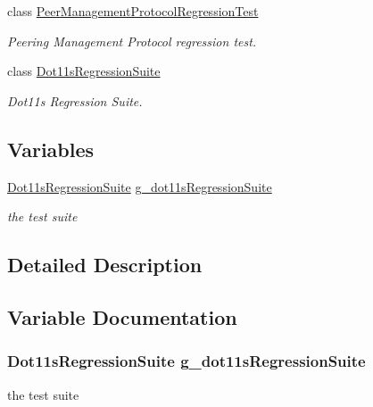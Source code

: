 \begin{DoxyCompactItemize}
class \hyperlink{classPeerManagementProtocolRegressionTest}{Peer\+Management\+Protocol\+Regression\+Test}
\begin{DoxyCompactList}\small\item\em Peering Management Protocol regression test. \end{DoxyCompactList}\item 
class \hyperlink{classDot11sRegressionSuite}{Dot11s\+Regression\+Suite}
\begin{DoxyCompactList}\small\item\em Dot11s Regression Suite. \end{DoxyCompactList}\end{DoxyCompactItemize}
\subsection*{Variables}
\begin{DoxyCompactItemize}
\item 
\hyperlink{classDot11sRegressionSuite}{Dot11s\+Regression\+Suite} \hyperlink{group__dot11s-test_ga0c680349a010296911d09487baac65a3}{g\+\_\+dot11s\+Regression\+Suite}
\begin{DoxyCompactList}\small\item\em the test suite \end{DoxyCompactList}\end{DoxyCompactItemize}


\subsection{Detailed Description}


\subsection{Variable Documentation}
\subsubsection[{\texorpdfstring{g\+\_\+dot11s\+Regression\+Suite}{g_dot11sRegressionSuite}}]{\setlength{\rightskip}{0pt plus 5cm} {\bf Dot11s\+Regression\+Suite}  g\+\_\+dot11s\+Regression\+Suite}\hypertarget{group__dot11s-test_ga0c680349a010296911d09487baac65a3}{}\label{group__dot11s-test_ga0c680349a010296911d09487baac65a3}


the test suite 

